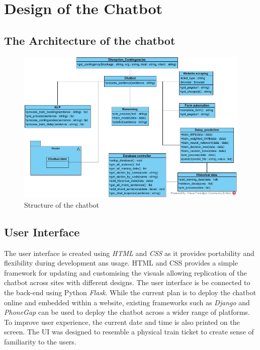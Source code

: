 \documentclass[11pt]{article}
\begin{document}
\section{Design of the Chatbot}

 
\subsection{The Architecture of the chatbot}
\begin{figure}[!htb]
	\centering
	\includegraphics[width=1.0\textwidth]{Chatbot_Structure}
	\caption{Structure of the chatbot }\label{fig:Chatbot_Structure}
\end{figure}
\subsection{User Interface} 
The user interface is created using \textit{HTML} and \textit{CSS} as it provides portability and flexibility during development ans usage. HTML and CSS provides a simple framework for updating and customising the visuals allowing replication of the chatbot across sites with different designs. The user interface is be connected to the back-end using Python \textit{Flask}. While the current plan is to deploy the chatbot online and embedded within a website, existing frameworks such as \textit{Django} and \textit{PhoneGap} can be used to deploy the chatbot across a wider range of platforms. To improve user experience, the current date and time is also printed on the screen. The UI was designed to resemble a physical train ticket to create sense of familiarity to the users.
\end{document}
